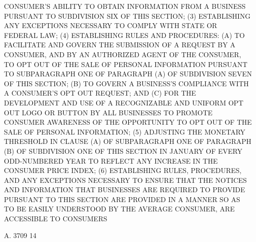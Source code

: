  CONSUMER'S ABILITY TO OBTAIN INFORMATION FROM  A  BUSINESS  PURSUANT  TO
 SUBDIVISION SIX OF THIS SECTION;
   (3)  ESTABLISHING  ANY  EXCEPTIONS  NECESSARY  TO COMPLY WITH STATE OR
 FEDERAL LAW;
   (4) ESTABLISHING RULES AND PROCEDURES: (A) TO  FACILITATE  AND  GOVERN
 THE SUBMISSION OF A REQUEST BY A CONSUMER, AND BY AN AUTHORIZED AGENT OF
 THE CONSUMER, TO OPT OUT OF THE SALE OF PERSONAL INFORMATION PURSUANT TO
 SUBPARAGRAPH  ONE OF PARAGRAPH (A) OF SUBDIVISION SEVEN OF THIS SECTION;
 (B) TO GOVERN A BUSINESS'S COMPLIANCE WITH A CONSUMER'S OPT OUT REQUEST;
 AND (C) FOR THE DEVELOPMENT AND USE OF A RECOGNIZABLE  AND  UNIFORM  OPT
 OUT  LOGO  OR  BUTTON BY ALL BUSINESSES TO PROMOTE CONSUMER AWARENESS OF
 THE OPPORTUNITY TO OPT OUT OF THE SALE OF PERSONAL INFORMATION;
   (5) ADJUSTING THE MONETARY THRESHOLD IN CLAUSE (A) OF SUBPARAGRAPH ONE
 OF PARAGRAPH (B) OF SUBDIVISION ONE OF THIS SECTION IN JANUARY OF  EVERY
 ODD-NUMBERED YEAR TO REFLECT ANY INCREASE IN THE CONSUMER PRICE INDEX;
   (6)  ESTABLISHING  RULES,  PROCEDURES, AND ANY EXCEPTIONS NECESSARY TO
 ENSURE THAT THE NOTICES AND INFORMATION THAT BUSINESSES ARE REQUIRED  TO
 PROVIDE  PURSUANT  TO  THIS SECTION ARE PROVIDED IN A MANNER SO AS TO BE
 EASILY UNDERSTOOD BY THE AVERAGE CONSUMER, ARE ACCESSIBLE  TO  CONSUMERS

 A. 3709                            14
 
